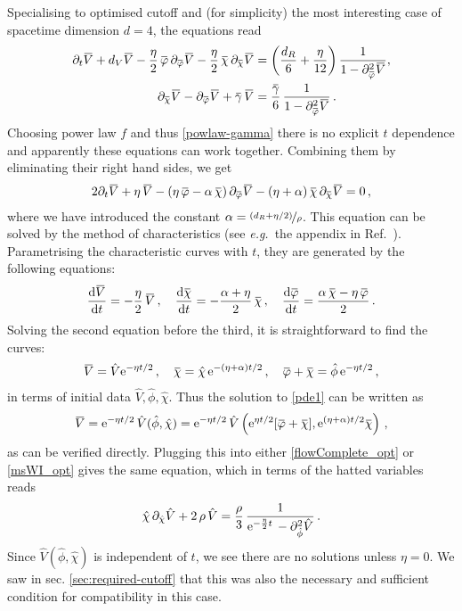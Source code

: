 \documentclass[11pt]{book}
\newcommand{\overbar}[1]{\mkern 1.5mu\overline{\mkern-1.5mu#1\mkern-1.5mu}\mkern 1.5mu}
\newcommand{\bV}{\overbar V}
\newcommand{\bp}{\overbar \varphi}
\newcommand{\bg}{\overbar \gamma}
\newcommand{\bc}{\overbar \chi}
\newcommand\eg{\textit{e.g.}\ }
\newcommand{\hV}{\hat V}
\newcommand{\hp}{\hat \phi}
\newcommand{\hc}{\hat \chi}
\numberwithin{equation}{chapter}
\begin{document}
Specialising to optimised cutoff and (for simplicity) the most interesting case of spacetime dimension $d=4$,
the equations read
\begin{align}
  \label{flowComplete_opt}
  \partial_t \bV + d_V \bV - \frac{\eta}{2} \, \bp \, \partial_{\bp} \bV -\frac{\eta}{2} \, \bc \,
  \partial_{\bc} \bV
  &= \left(  \frac{d_R}{6} + \frac{\eta}{12} \right) \frac{1}{1 -  \partial^2_{\bp} \bV},\\
  \label{msWI_opt}
  \partial_{\bc} \bV - \partial_{\bp} \bV + \bg \, \bV
  &= \frac{\bg}{6} \, \frac{1}{1 - \partial^2_{\bp} \bV}\,.
\end{align}
Choosing power law $f$ and thus \eqref{powlaw-gamma} there is no explicit $t$ dependence and apparently
these equations can work together. Combining them by eliminating their right hand sides, we get
\begin{align}
  \label{pde1}
  2\partial_t \bV + \eta \, \bV - \left(\eta \, \bp - \alpha \, \bc\right)\partial_{\bp} \bV - (\eta+\alpha) \, \bc \, \partial_{\bc} \bV = 0\,,
\end{align}
where we have introduced the constant $\alpha = \nicefrac{(d_R+\eta/2)}{\rho}$.
This equation can be solved by the method of characteristics
(see \eg the appendix in Ref.~\cite{Dietz:2015owa}).
Parametrising the characteristic curves with $t$, they are generated by the following equations:
\begin{align}
  \frac{\mathrm d\bV}{\mathrm dt} = -\frac{\eta}{2} \, \bV\,,
  \quad
  \frac{\mathrm d\bc}{\mathrm dt}=-\frac{\alpha+\eta}{2} \, \bc\,,
  \quad
  \frac{\mathrm d\bp}{\mathrm dt}=\frac{\alpha\,\bc-\eta\,\bp}{2}\,.
\end{align}
Solving the second equation before the third, it is straightforward to find the curves:
\begin{align}
  \bV = \hV {\rm e}^{-\eta t/2}\,,\quad \bc = \hc\, {\rm e}^{-(\eta+\alpha)t/2}\,,\quad \bp+\bc = \hp\, {\rm e}^{-\eta t/2}\,,
\end{align}
in terms of initial data $\hV,\hp,\hc$.
Thus the solution to \eqref{pde1} can be written as
\begin{align}
  \bV ={\rm e}^{-\eta t/2}\, \hV(\hp,\hc) ={\rm e}^{-\eta t/2} \,\hV\left({\rm e}^{\eta t/2}[\bp+\bc],{\rm e}^{(\eta+\alpha)t/2}\bc\right)\,,
\end{align}
as can be verified directly. Plugging this into either \eqref{flowComplete_opt} or \eqref{msWI_opt}
gives the same equation, which in terms of the hatted variables reads
\begin{align}
  \hc \, \partial_{\hc}\hV + 2 \, \rho \, \hV = \frac{\rho}{3} \, \frac{1}{{\rm e}^{-\frac{\eta}{2} t} \,-\partial^2_{\hp}\hV}\,.
\end{align}
Since $\hV(\hp,\hc)$ is independent of $t$, we see there are no solutions unless $\eta=0$.
We saw in sec. \ref{sec:required-cutoff} that this was also the necessary and sufficient condition for
compatibility in this case.
\end{document}

